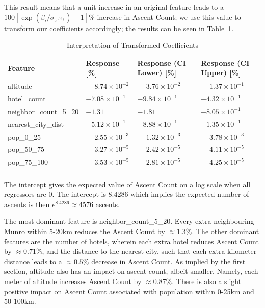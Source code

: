 \documentclass[11pt,a4paper]{article}
\begin{document}
This result means that a unit increase in an original feature leads to a $100[\exp(\beta_i / \sigma_{x^{(i)}}) - 1]\%$ increase in Ascent Count; we use this value to transform our coefficients accordingly; the results can be seen in Table~\ref{table:2}.
\begin{table} [h!]
\centering
\caption{Interpretation of Transformed Coefficients}
\begin{tabular}{l l l l}
\toprule
    Feature & 
    Response [\%] & 
    Response (CI Lower) [\%] & 
    Response (CI Upper) [\%] \\
\midrule
altitude & $\phantom{-}8.74 \times 10^{-2}$ & $\phantom{-}3.76\times 10^{-2}$ & $\phantom{-}1.37\times 10^{-1}$ \\
hotel\_count & $-7.08\times 10^{-1}$ & $-9.84\times 10^{-1}$ & $-4.32\times 10^{-1}$ \\
neighbor\_count\_5\_20 & $-1.31$ & $-1.81$ & $-8.05\times 10^{-1}$ \\
nearest\_city\_dist & $-5.12\times 10^{-1}$ & $-8.88\times 10^{-1}$ & $-1.35\times 10^{-1}$ \\
pop\_0\_25 & $\phantom{-}2.55 \times 10^{-3}$ & $\phantom{-}1.32\times 10^{-3}$ & $\phantom{-}3.78\times 10^{-3}$ \\
pop\_50\_75 & $\phantom{-}3.27 \times 10^{-5}$ & $\phantom{-}2.42\times 10^{-5}$ &  $\phantom{-}4.11\times 10^{-5}$ \\
pop\_75\_100 & $\phantom{-}3.53 \times 10^{-5}$ & $\phantom{-}2.81\times 10^{-5}$ &  $\phantom{-}4.25\times 10^{-5}$\\
\bottomrule
\label{table:2}
\end{tabular}
\end{table}

The intercept gives the expected value of Ascent Count on a log scale when all regressors are 0. The intercept is 8.4286 which implies the expected number of ascents is then $e^{8.4286} \approx 4576$ ascents.

The most dominant feature is neighbor\_count\_5\_20. Every extra neighbouring Munro within 5-20km reduces the Ascent Count by $ \approx 1.3\%$. The other dominant features are the number of hotels, wherein each extra hotel reduces Ascent Count by $\approx 0.71\%$, and the distance to the nearest city, such that each extra kilometer distance leads to a $\approx 0.5\%$ decrease in Ascent Count. As implied by the first section, altitude also has an impact on ascent count, albeit smaller. Namely, each meter of altitude increases Ascent Count by $\approx 0.87\%$. There is also a slight positive impact on Ascent Count associated with population within 0-25km and 50-100km.
\end{document}
